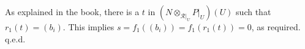 \documentclass[12pt]{article}
\theoremstyle{remark}
\theoremstyle{definition}
\newcommand{\cc}{\mathcal}
\begin{document}
As explained in the book, there is a $t$ in $(N\otimes_{\cc R|_U}P|_U)(U)$ such that $r_1(t)=(b_i)$. This implies $s=f_1((b_i))=f_1(r_1(t))=0$, as required. q.e.d.
%
%
%
%
\end{document}
